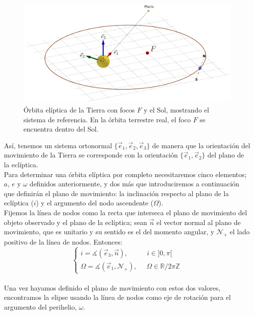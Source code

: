 \begin{figure}[H]
\centering
\includegraphics[scale=0.3]{images/sistema_coordenadas.png}
\caption{Órbita elíptica de la Tierra con focos $F$ y el Sol, mostrando el sistema de referencia. En la órbita terrestre real, el foco $F$ se encuentra dentro del Sol.}
\label{fig:sistema_referencia}
\end{figure}

Así, tenemos un sistema ortonormal $\{\vec{e}_1,\vec{e}_2,\vec{e}_3\}$ de manera que la orientación del movimiento de la Tierra se corresponde con la orientación $\{\vec{e}_1,\vec{e}_2\}$ del plano de la eclíptica.\\

Para determinar una órbita elíptica por completo necesitaremos cinco elementos; $a$, $e$ y $\omega$ definidos anteriormente, y dos más que introduciremos a continuación que definirán el plano de movimiento: la inclinación respecto al plano de la eclíptica ($i$) y el argumento del nodo ascendente ($\Omega$).\\

Fijemos la línea de nodos como la recta que interseca el plano de movimiento del objeto observado y el plano de la eclíptica; sean $\vec{n}$ el vector normal al plano de movimiento, que es unitario y su sentido es el del momento angular, y $\mathcal{N}_+$ el lado positivo de la línea de nodos. Entonces:
\[
\left\{
\begin{array}{l}
	i=\measuredangle(\vec{e}_3,\vec{n}), \; \; \; \; \; \; \; \; \; \; i\in]0,\pi[\\
	\Omega=\measuredangle(\vec{e}_1, \mathcal{N}_+), \; \; \; \; \; \Omega\in\mathbb{R}/2\pi\mathbb{Z}
\end{array}
\right.
\]\\

Una vez hayamos definido el plano de movimiento con estos dos valores, encontramos la elipse usando la línea de nodos como eje de rotación para el argumento del perihelio, $\omega$.

